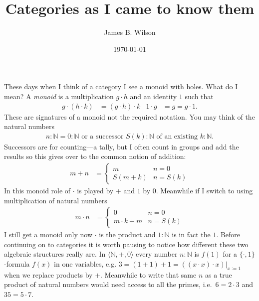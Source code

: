 \documentclass[12pt,twoside,letterpaper]{memoir}
\begin{document}
\author{James B. Wilson}
\title{Categories as I came to know them}
\date{\today}
\maketitle

These days when I think of a category I see a monoid with holes. What do I mean?
A \emph{monoid} is a multiplication $g\cdot h$ and an identity $1$ such that
\begin{align*}
    g\cdot (h\cdot k) & = (g\cdot h)\cdot k 
    & 
    1\cdot g & = g = g\cdot 1.
\end{align*}
These are signatures of a monoid not the required notation.
You may think of the natural numbers 
\begin{align*}
    n:\mathbb{N} = 0:\mathbb{N} 
    \text{ or a successor } S(k):\mathbb{N} 
    \text{ of an existing } k:\mathbb{N}.
\end{align*}
Successors are for counting---a tally, but I often count in groups and 
add the results so this gives over to the common notion of addition:
\begin{align*}
    m+n & = \begin{cases} m & n=0\\ S(m+k) & n=S(k) \end{cases}
\end{align*}
In this monoid role of $\cdot$ is played by $+$ and $1$ by $0$.
Meanwhile if I switch to using multiplication of natural numbers 
\begin{align*}
    m\cdot n & = \begin{cases} 0 & n=0\\ m\cdot k +m & n=S(k) \end{cases}
\end{align*}
I still get a monoid only now $\cdot$ is the product and $1:\mathbb{N}$
is in fact the $1$.  Before continuing on to categories it is 
worth pausing to notice how different these two algebraic structures 
really are.  In $\langle \mathbb{N},+,0\rangle$ every number $n:\mathbb{N}$ 
is $f(1)$ for a $\{\cdot,1\}$-formula $f(x)$ in one variables, e.g. 
$3=(1+1)+1=((x\cdot x)\cdot x)|_{x:=1}$ when we replace products by $+$.
Meanwhile to write that same $n$ as a true product of natural numbers 
would need access to all the primes, i.e.\ $6=2\cdot 3$ and $35=5\cdot 7$.
\end{document}
